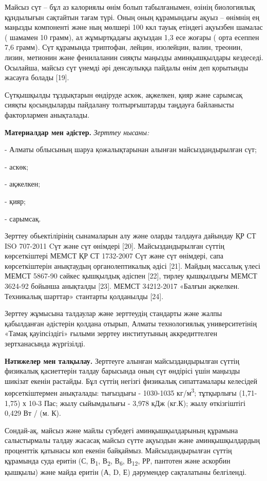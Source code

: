 \begin{multicols}{2}
Майсыз сүт -- бұл аз калориялы өнім болып табылғанымен, өзінің
биологиялық құндылығын сақтайтын тағам түрі. Оның оның құрамындағы ақуыз
-- өнімнің ең маңызды компоненті және ның мөлшері 100 ккл тауық етіндегі
ақуызбен шамалас ( шамамен 10 грамм), ал жұмыртқадағы ақуыздан 1,3 есе
жоғары ( орта есеппен 7,6 грамм). Сүт құрамында триптофан, лейцин,
изолейцин, валин, треонин, лизин, метионин және фенилаланин сияқты
маңызды аминқышқылдары кездеседі. Осылайша, майсыз сүт үнемді әрі
денсаулыққа пайдалы өнім деп қорытынды жасауға болады {[}19{]}.

Сүтқышқылды тұздықтарын өндіруде аскөк, ақжелкен, қияр және сарымсақ
сияқты қосындыларды пайдалану толтырғыштарды таңдауға байланысты
факторлармен анықталады.

{\bfseries Материалдар мен әдістер.} \emph{Зерттеу нысаны:}

- Алматы облысының шаруа қожалықтарынан алынған майсыздандырылған сүт;

- аскөк;

- ақжелкен;

- қияр;

- сарымсақ.

Зерттеу обьектілірінің сынамаларын алу және оларды талдауға дайындау ҚР
СТ ISO 707-2011 Cүт және сүт өнімдері {[}20{]}. Майсыздандырылған сүттің
көрсеткіштері МЕМСТ ҚР СТ 1732-2007 Сүт және сүт өнімдері, сапа
көрсеткіштерін анықтаудың органолептикалық әдісі {[}21{]}. Майдың
массалық үлесі МЕМСТ 5867-90 сәйкес қышқылдық әдіспен {[}22{]}, тирлеу
қышқылдығы МЕМСТ 3624-92 бойынша анықталды {[}23{]}. МЕМСТ 34212-2017
«Балғын ақжелкен. Техникалық шарттар» стантарты қолданылды {[}24{]}.

Зерттеу жұмысына талдаулар және зерттеудің стандарты және жалпы
қабылданған әдістерін қолдана отырып, Алматы технологиялық
университетінің «Тамақ қауіпсіздігі» ғылыми зерртеу институтының
аккредиттелген зертханасында жүргізілді.

{\bfseries Нәтижелер мен талқылау.} Зерттеуге алынған майсыздандырылған
сүттің физикалық қасиеттерін талдау барысында оның сүт өндірісі үшін
маңызды шикізат екенін растайды. Бұл сүттің негізгі физикалық
сипаттамалары келесідей көрсеткіштермен анықталады: тығыздығы -
1030-1035 кг/м\textsuperscript{3}; тұтқырлығы (1,71-1,75) х 10-3 Пас;
жылу сыйымдылығы - 3,978 кДж (кг.К); жылу өткізгіштігі 0,429 Вт / (м.
К).

Сондай-ақ, майсыз және майлы сүзбедегі аминқышқылдарының құрамына
салыстырмалы талдау жасасақ майсыз сүтте ақуыздын және аминқышқылдардың
проценттік қатынасы коп екенін байқаймыз. Майсыздандырылған сүттің
құрамында суда еритін (С, В\textsubscript{1}, В\textsubscript{2},
В\textsubscript{6}, В\textsubscript{12}, РР, пантотен және аскорбин
қышқылы) және майда еритін (А, D, Е) дәрумендер сақталатыны белгіленді.


\end{multicols}
